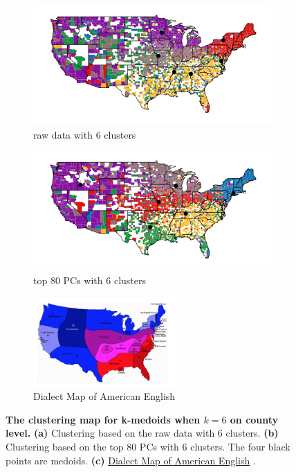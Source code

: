 \begin{figure}[t!]
    \centering
    \begin{subfigure}[t]{0.49\textwidth}
        \includegraphics[width=1\textwidth]{fig/kmedoids6_raw.pdf}
        \caption{raw data with 6 clusters}
    \end{subfigure}
    \begin{subfigure}[t]{0.49\textwidth}
        \includegraphics[width=1\textwidth]{fig/kmedoids6_PCA80.pdf}
                \caption{top 80 PCs with 6 clusters}
    \end{subfigure}
        \begin{subfigure}[t]{\textwidth}
        \centering
        \includegraphics[width=0.6\textwidth, height= 0.4\textwidth]{fig/reference_map.pdf}
                \caption{Dialect Map of American English}
    \end{subfigure}
    \caption{\textbf{The clustering map for k-medoids when $k = 6$ on county level.} \textbf{(a)} Clustering based on the raw data with 6 clusters. \textbf{(b)}  Clustering based on the top 80 PCs with 6 clusters. The four black points are medoids. \textbf{(c)} \href{http://robertspage.com/dialects.html}{Dialect Map of American English} .} \label{fig: k-medoids_reference}
\end{figure}
